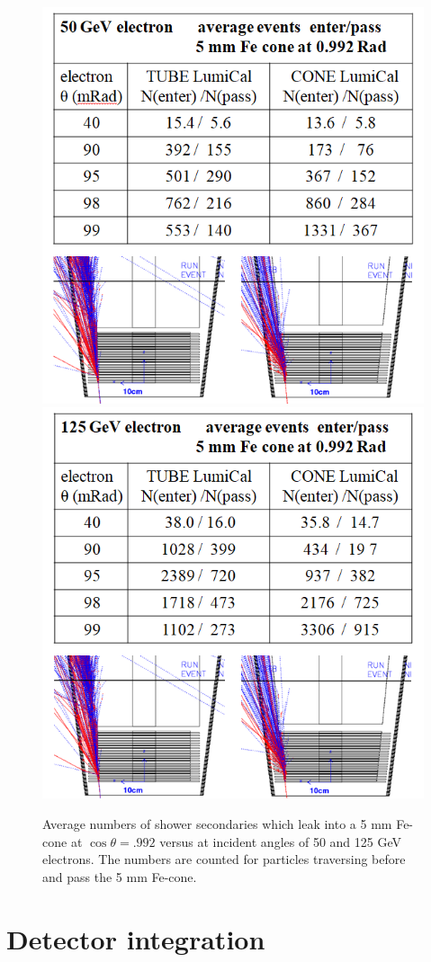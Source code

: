\begin{figure}[th!] 
	\centering
	\includegraphics[width=.40\linewidth]{Figures/MDI/shower_leak_50.png}   
	\hspace{.5cm}
	\includegraphics[width=.405\linewidth]{Figures/MDI/shower_leak_125.png}   
	\vspace{-.2cm}
	\caption{ Average numbers of shower secondaries which leak into a 5 mm Fe-cone
		at $\cos\theta=.992$ versus at incident angles of 50 and 125 GeV electrons.
		The numbers are counted for particles traversing before and pass the 5 mm Fe-cone.
		\label{fig:leak_fraction} }
\end{figure}





\section{Detector integration}








